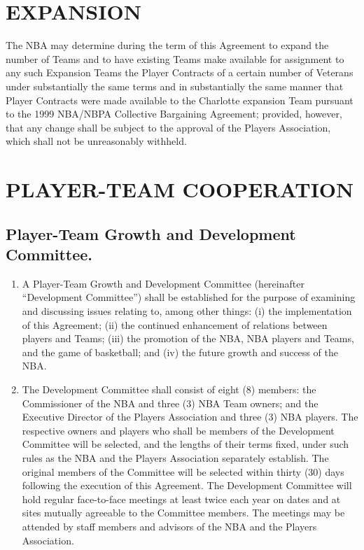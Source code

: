 \documentclass[
]{book}
\providecommand{\tightlist}{%
  \setlength{\itemsep}{0pt}\setlength{\parskip}{0pt}}
\begin{document}
\hypertarget{expansion}{%
\chapter{EXPANSION}\label{expansion}}

The NBA may determine during the term of this Agreement to expand the number of Teams and to have existing Teams make available for assignment to any such Expansion Teams the Player Contracts of a certain number of Veterans under substantially the same terms and in substantially the same manner that Player Contracts were made available to the Charlotte expansion Team pursuant to the 1999 NBA/NBPA Collective Bargaining Agreement; provided, however, that any change shall be subject to the approval of the Players Association, which shall not be unreasonably withheld.

\hypertarget{player-team-cooperation}{%
\chapter{PLAYER-TEAM COOPERATION}\label{player-team-cooperation}}

\hypertarget{player-team-growth-and-development-committee.}{%
\section{Player-Team Growth and Development Committee.}\label{player-team-growth-and-development-committee.}}

\begin{enumerate}
\def\labelenumi{(\alph{enumi})}
\tightlist
\item
  A Player-Team Growth and Development Committee (hereinafter ``Development Committee'') shall be established for the purpose of examining and discussing issues relating to, among other things: (i) the implementation of this Agreement; (ii) the continued enhancement of relations between players and Teams; (iii) the promotion of the NBA, NBA players and Teams, and the game of basketball; and (iv) the future growth and success of the NBA.
\item
  The Development Committee shall consist of eight (8) members: the Commissioner of the NBA and three (3) NBA Team owners; and the Executive Director of the Players Association and three (3) NBA players. The respective owners and players who shall be members of the Development Committee will be selected, and the lengths of their terms fixed, under such rules as the NBA and the Players Association separately establish. The original members of the Committee will be selected within thirty (30) days following the execution of this Agreement. The Development Committee will hold regular face-to-face meetings at least twice each year on dates and at sites mutually agreeable to the Committee members. The meetings may be attended by staff members and advisors of the NBA and the Players Association.
\end{enumerate}
\end{document}
